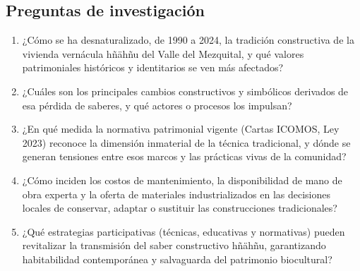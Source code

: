 \subsection{Preguntas de investigación}

\begin{enumerate}
	\item {¿Cómo se ha desnaturalizado, de 1990 a 2024, la tradición constructiva de la vivienda vernácula hñähñu del Valle del Mezquital, y qué valores patrimoniales históricos y identitarios se ven más afectados?}

	\item {¿Cuáles son los principales cambios constructivos y simbólicos derivados de esa pérdida de saberes, y qué actores o procesos los impulsan?}

	\item {¿En qué medida la normativa patrimonial vigente (Cartas ICOMOS, Ley 2023) reconoce la dimensión inmaterial de la técnica tradicional, y dónde se generan tensiones entre esos marcos y las prácticas vivas de la comunidad?}

	\item {¿Cómo inciden los costos de mantenimiento, la disponibilidad de mano de obra experta y la oferta de materiales industrializados en las decisiones locales de conservar, adaptar o sustituir las construcciones tradicionales?}

	\item {¿Qué estrategias participativas (técnicas, educativas y normativas) pueden revitalizar la transmisión del saber constructivo hñähñu, garantizando habitabilidad contemporánea y salvaguarda del patrimonio biocultural?}
\end{enumerate}
